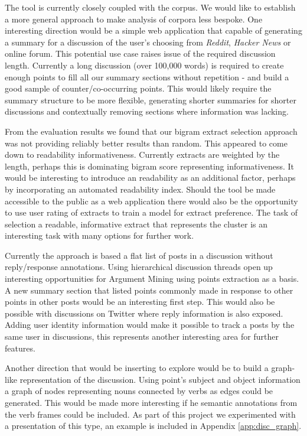     The tool is currently closely coupled with the corpus. We would like to establish a more general approach to make analysis of corpora less bespoke. One interesting direction would be a simple web application that capable of generating a summary for a discussion of the user's choosing from \textit{Reddit}, \textit{Hacker News} or online forum. This potential use case raises issue of the required discussion length. Currently a long discussion (over 100,000 words) is required to create enough points to fill all our summary sections without repetition - and build a good sample of counter/co-occurring points. This would likely require the summary structure to be more flexible, generating shorter summaries for shorter discussions and contextually removing sections where information was lacking.

    From the evaluation results we found that our bigram extract selection approach was not providing reliably better results than random. This appeared to come down to readability informativeness. Currently extracts are weighted by the length, perhaps this is dominating bigram score representing informativeness. It would be interesting to introduce an readability as an additional factor, perhaps by incorporating an automated readability index. Should the tool be made accessible to the public as a web application there would also be the opportunity to use user rating of extracts to train a model for extract preference. The task of selection a readable, informative extract that represents the cluster is an interesting task with many options for further work.

    Currently the approach is based a flat list of posts in a discussion without reply/response annotations. Using hierarchical discussion threads open up interesting opportunities for Argument Mining using points extraction as a basis. A new summary section that listed points commonly made in response to other points in other posts would be an interesting first step. This would also be possible with discussions on Twitter where reply information is also exposed. Adding user identity information would make it possible to track a posts by the same user in discussions, this represents another interesting area for further features.

    Another direction that would be inserting to explore would be to build a graph-like representation of the discussion. Using point's subject and object information a graph of nodes representing nouns connected by verbs as edges could be generated. This would be made more interesting if he semantic annotations from the verb frames could be included. As part of this project we experimented with a presentation of this type, an example is included in Appendix \ref{app:disc_graph}.

